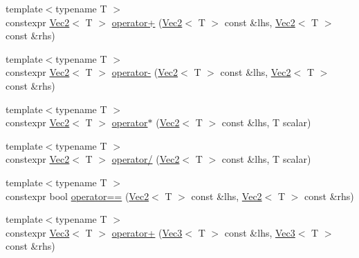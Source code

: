 \begin{DoxyCompactItemize}
\item 
{\footnotesize template$<$typename T $>$ }\\constexpr \mbox{\hyperlink{namespace_saturn_1_1_math_a8befc95aeff660bda92b8807c1cc5224}{Vec2}}$<$ T $>$ \mbox{\hyperlink{namespace_saturn_1_1_math_a96a70ad9ebf01c281f9bd4ffa21f654e}{operator+}} (\mbox{\hyperlink{namespace_saturn_1_1_math_a8befc95aeff660bda92b8807c1cc5224}{Vec2}}$<$ T $>$ const \&lhs, \mbox{\hyperlink{namespace_saturn_1_1_math_a8befc95aeff660bda92b8807c1cc5224}{Vec2}}$<$ T $>$ const \&rhs)
\item 
{\footnotesize template$<$typename T $>$ }\\constexpr \mbox{\hyperlink{namespace_saturn_1_1_math_a8befc95aeff660bda92b8807c1cc5224}{Vec2}}$<$ T $>$ \mbox{\hyperlink{namespace_saturn_1_1_math_a72c8b985e10b066ba66aa5ec704395e8}{operator-\/}} (\mbox{\hyperlink{namespace_saturn_1_1_math_a8befc95aeff660bda92b8807c1cc5224}{Vec2}}$<$ T $>$ const \&lhs, \mbox{\hyperlink{namespace_saturn_1_1_math_a8befc95aeff660bda92b8807c1cc5224}{Vec2}}$<$ T $>$ const \&rhs)
\item 
{\footnotesize template$<$typename T $>$ }\\constexpr \mbox{\hyperlink{namespace_saturn_1_1_math_a8befc95aeff660bda92b8807c1cc5224}{Vec2}}$<$ T $>$ \mbox{\hyperlink{namespace_saturn_1_1_math_ab149eb158c27cbe7edb4f2939177e2d6}{operator$\ast$}} (\mbox{\hyperlink{namespace_saturn_1_1_math_a8befc95aeff660bda92b8807c1cc5224}{Vec2}}$<$ T $>$ const \&lhs, T scalar)
\item 
{\footnotesize template$<$typename T $>$ }\\constexpr \mbox{\hyperlink{namespace_saturn_1_1_math_a8befc95aeff660bda92b8807c1cc5224}{Vec2}}$<$ T $>$ \mbox{\hyperlink{namespace_saturn_1_1_math_a477288f20d2a6b277a192eb37ec502b7}{operator/}} (\mbox{\hyperlink{namespace_saturn_1_1_math_a8befc95aeff660bda92b8807c1cc5224}{Vec2}}$<$ T $>$ const \&lhs, T scalar)
\item 
{\footnotesize template$<$typename T $>$ }\\constexpr bool \mbox{\hyperlink{namespace_saturn_1_1_math_ade75807d0c4b3701a90134b551403ce4}{operator==}} (\mbox{\hyperlink{namespace_saturn_1_1_math_a8befc95aeff660bda92b8807c1cc5224}{Vec2}}$<$ T $>$ const \&lhs, \mbox{\hyperlink{namespace_saturn_1_1_math_a8befc95aeff660bda92b8807c1cc5224}{Vec2}}$<$ T $>$ const \&rhs)
\item 
{\footnotesize template$<$typename T $>$ }\\constexpr \mbox{\hyperlink{namespace_saturn_1_1_math_af4a7a893730c64ac02b620f648cc5406}{Vec3}}$<$ T $>$ \mbox{\hyperlink{namespace_saturn_1_1_math_ad648c543657af1553c06c2870c57904d}{operator+}} (\mbox{\hyperlink{namespace_saturn_1_1_math_af4a7a893730c64ac02b620f648cc5406}{Vec3}}$<$ T $>$ const \&lhs, \mbox{\hyperlink{namespace_saturn_1_1_math_af4a7a893730c64ac02b620f648cc5406}{Vec3}}$<$ T $>$ const \&rhs)

\end{DoxyCompactItemize}
